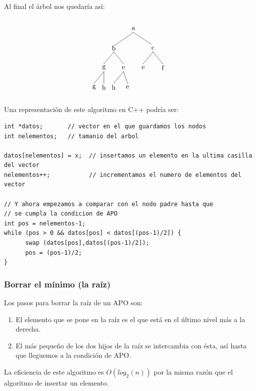 \documentclass[10pt,a4paper,spanish]{report}
\begin{document}
\noindent
Al final el árbol nos quedaría así:

\[\begin{xy}
,(0,0)*+=<10mm>[]\txt<2cm>{a}
,(-10,-10)*+=<10mm>[]\txt<2cm>{b}
,(10,-10)*+=<10mm>[]\txt<2cm>{c}
,(-15,-20)*+=<10mm>[]\txt<2cm>{g}
,(-5,-20)*+=<10mm>[]\txt<2cm>{e}
,(5,-20)*+=<10mm>[]\txt<2cm>{e}
,(15,-20)*+=<10mm>[]\txt<2cm>{f}
,(-20,-30)*+=<10mm>[]\txt<2cm>{g}
,(-15,-30)*+=<10mm>[]\txt<2cm>{h}
,(-10,-30)*+=<10mm>[]\txt<2cm>{h}
,(-3,-30)*+=<5mm>[]\txt<0.5cm>{e}

\ar@{-} (0,-2);(-10,-9)
\ar@{-} (0,-2);(9,-8)
\ar@{-} (-10,-12);(-15,-18)
\ar@{-} (10,-12);(5,-18)
\ar@{-} (10,-12);(15,-18)
\ar@{-} (-15,-22);(-20,-28)
\ar@{-} (-15,-22);(-15,-28)
\ar@{-} (-10,-12);(-5,-18)
\ar@{-} (-5,-22);(-10,-28)
\ar@{-} (-5,-22);(-3,-28)
\end{xy}\]

\noindent
Una representación de este algoritmo en C++ podría ser:

\begin{verbatim}
int *datos;       // vector en el que guardamos los nodos
int nelementos;   // tamanio del arbol

datos[nelementos] = x;  // insertamos un elemento en la ultima casilla del vector
nelementos++;           // incrementamos el numero de elementos del vector

// Y ahora empezamos a comparar con el nodo padre hasta que
// se cumpla la condicion de APO
int pos = nelementos-1; 
while (pos > 0 && datos[pos] < datos[(pos-1)/2]) {
      swap (datos[pos],datos[(pos-1)/2]);
      pos = (pos-1)/2;
}
\end{verbatim}

\subsubsection{\textcolor[rgb]{0.3,0.4,0.8}Borrar el mínimo (la raíz)}
\noindent
Los pasos para borrar la raíz de un APO son:
\begin{enumerate}
      \item El elemento que se pone en la raíz es el que está en el último nivel más a la derecha.
      \item El más pequeño de los dos hijos de la raíz se intercambia con ésta, así hasta que lleguemos a la condición de APO.
\end{enumerate}

\noindent
La eficiencia de este algoritmo es $O(log_2(n))$ por la misma razón que el algoritmo de insertar un elemento.
\end{document}
